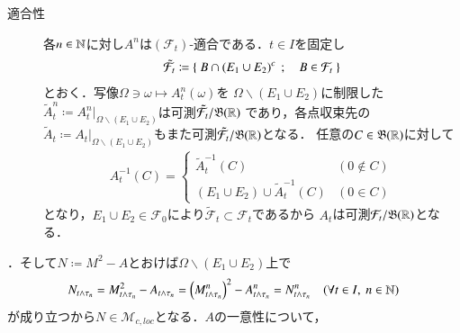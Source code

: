 \begin{prf}
\begin{description}
{\begin{description}
						\item[適合性]
							各$n \in \mathbb{N}$に対し$A^n$は$(\mathcal{F}_t)$-適合である．$t \in I$を固定し
							\begin{align}
								\tilde{\mathcal{F}}_t \coloneqq \left\{\ B \cap (E_1 \cup E_2)^c\ \, ; \quad B \in \mathcal{F}_t\ \right\}
							\end{align}
							とおく．写像$\Omega \ni \omega \longmapsto A_t^n(\omega)$を
							$\Omega \backslash (E_1 \cup E_2)$に制限した$\tilde{A}_t^n \coloneqq A_t^n|_{\Omega \backslash (E_1 \cup E_2)}$は可測$\tilde{\mathcal{F}}_t/\mathfrak{B}(\mathbb{R})$
							であり，各点収束先の$\tilde{A}_t \coloneqq A_t|_{\Omega \backslash (E_1 \cup E_2)}$もまた可測$\tilde{\mathcal{F}}_t/\mathfrak{B}(\mathbb{R})$となる．
							任意の$C \in \mathfrak{B}(\mathbb{R})$に対して
							\begin{align}
								A_t^{-1}(C) =
								\begin{cases}
									\tilde{A}_t^{-1}(C) & (0 \notin C) \\
									(E_1 \cup E_2) \cup \tilde{A}_t^{-1}(C) & (0 \in C)
								\end{cases}
							\end{align}
							となり，$E_1 \cup E_2 \in \mathcal{F}_0$により$\tilde{\mathcal{F}}_t \subset \mathcal{F}_t$であるから
							$A_t$は可測$\mathcal{F}_t/\mathfrak{B}(\mathbb{R})$となる．
					\end{description}
				}
				．そして$N \coloneqq M^2 - A$とおけば$\Omega \backslash (E_1 \cup E_2)$上で
				\begin{align}
					N_{t \wedge \tau_n} = M_{t \wedge \tau_n}^2 - A_{t \wedge \tau_n} 
					= \left( M_{t \wedge \tau_n}^n \right)^2 - A_{t \wedge \tau_n}^n
					= N_{t \wedge \tau_n}^n \quad (\forall t \in I,\ n \in \mathbb{N})
				\end{align}
				が成り立つから$N \in \mathcal{M}_{c,loc}$となる．$A$の一意性について，
		\end{description}
	\end{prf}